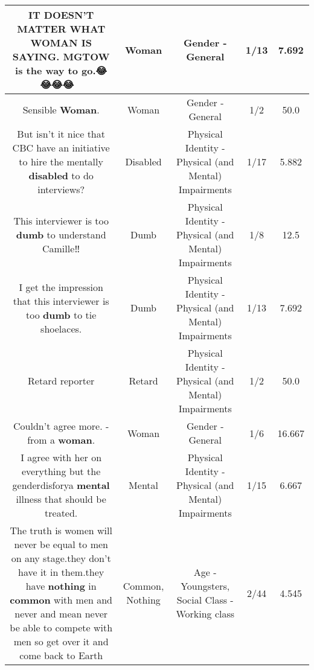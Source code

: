 \documentclass[11pt]{article}
\newlength\mylength
\begin{document}
\begin{center}
\begin{longtable}{|C{.65\mylength}|C{.30\mylength}|C{.12\mylength}|C{.12\mylength}|C{.12\mylength}|}
  \small IT DOESN'T MATTER WHAT \textbf{WOMAN} IS SAYING.  MGTOW is the way to go.😂😂😂😂🥃🥃🥃\normalsize   & Woman & Gender - General & 1/13 & 7.692 \\  \hline
  \small Sensible \textbf{Woman}.\normalsize   & Woman & Gender - General & 1/2 & 50.0 \\  \hline
  \small But isn't it nice that CBC have an initiative to hire the mentally \textbf{disabled} to do interviews?\normalsize   & Disabled & Physical Identity - Physical (and Mental) Impairments & 1/17 & 5.882 \\  \hline
  \small This interviewer is too \textbf{dumb} to understand Camille‼️\normalsize   & Dumb & Physical Identity - Physical (and Mental) Impairments & 1/8 & 12.5 \\  \hline
  \small I get the impression that this interviewer is too \textbf{dumb} to tie shoelaces.\normalsize   & Dumb & Physical Identity - Physical (and Mental) Impairments & 1/13 & 7.692 \\  \hline
  \small Retard reporter\normalsize   & Retard & Physical Identity - Physical (and Mental) Impairments & 1/2 & 50.0 \\  \hline
  \small Couldn't agree more. -from a \textbf{woman}.\normalsize   & Woman & Gender - General & 1/6 & 16.667 \\  \hline
  \small I agree with her on everything but the genderdisforya \textbf{mental} illness that should be treated.\normalsize   & Mental & Physical Identity - Physical (and Mental) Impairments & 1/15 & 6.667 \\  \hline
  \small The truth is women will never be equal to men on any stage.they don't have it in them.they have \textbf{nothing} in \textbf{common} with men and never and mean never be able to compete with men so get over it and come back to Earth\normalsize   & Common, Nothing & Age - Youngsters, Social Class - Working class & 2/44 & 4.545 \\  \hline

\end{longtable}
\end{center}
\end{document}
